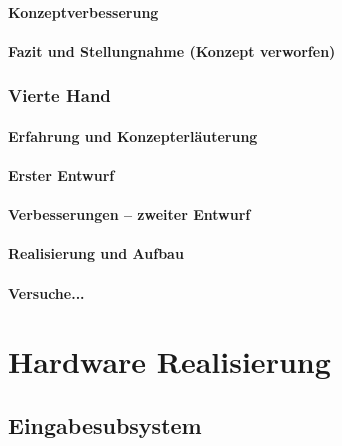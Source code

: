 \documentclass[titlepage,12pt,twoside]{article}
\begin{document}
\paragraph{Konzeptverbesserung}
\hfill \break
\hfill \break

\paragraph{Fazit und Stellungnahme (Konzept verworfen)}
\hfill \break
\hfill \break

\subsubsection{Vierte Hand}
\paragraph{Erfahrung und Konzepterläuterung}
\hfill \break
\hfill \break

\paragraph{Erster Entwurf}
\hfill \break
\hfill \break

\paragraph{Verbesserungen – zweiter Entwurf}
\hfill \break
\hfill \break

\paragraph{Realisierung und Aufbau}
\hfill \break
\hfill \break

\paragraph{Versuche...}
\hfill \break
\hfill \break


\section{Hardware Realisierung}

\subsection{Eingabesubsystem}
\end{document}
